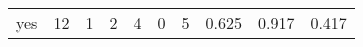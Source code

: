 \begin{longtable}{lp{2.0cm}p{2.0cm}p{2.0cm}p{2.0cm}p{2.0cm}p{2.0cm}p{2.0cm}p{2.0cm}p{2.0cm}}
yes       &                     12 &                                             1 &                                            2 &                                           4 &                                            0 &                                          5 &                                0.625 &                                  0.917 &                                0.417 \\
\end{longtable}
